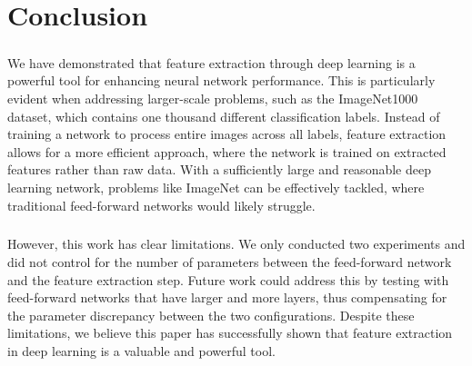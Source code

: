 \chapter{Conclusion}
\paragraph{}
We have demonstrated that feature extraction through deep learning is a powerful tool for enhancing neural network performance. This is particularly evident when addressing larger-scale problems, such as the ImageNet1000 dataset, which contains one thousand different classification labels. Instead of training a network to process entire images across all labels, feature extraction allows for a more efficient approach, where the network is trained on extracted features rather than raw data. With a sufficiently large and reasonable deep learning network, problems like ImageNet can be effectively tackled, where traditional feed-forward networks would likely struggle.
\paragraph{}
However, this work has clear limitations. We only conducted two experiments and did not control for the number of parameters between the feed-forward network and the feature extraction step. Future work could address this by testing with feed-forward networks that have larger and more layers, thus compensating for the parameter discrepancy between the two configurations. Despite these limitations, we believe this paper has successfully shown that feature extraction in deep learning is a valuable and powerful tool.



\nocite{dlib09}